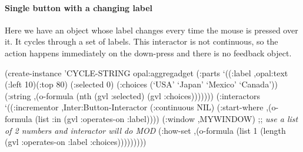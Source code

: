 \paragraph{Single button with a changing label}
Here we have an object whose label changes every time the mouse is pressed
over it.  It cycles through a set of labels.
This interactor is not continuous, so the action happens immediately on the
down-press and there is no feedback object.

\begin{programexample}
(create-instance 'CYCLE-STRING opal:aggregadget
  (:parts
   `((:label ,opal:text
             (:left 10)(:top 80)
             (:selected 0)
             (:choices (`USA' `Japan' `Mexico' `Canada'))
             (:string ,(o-formula (nth (gvl :selected) (gvl :choices)))))))
  (:interactors
   `((:incrementor ,Inter:Button-Interactor
	           (:continuous NIL)
		   (:start-where
		     ,(o-formula (list :in (gvl :operates-on :label))))
		   (:window ,MYWINDOW)
		   ;; {\it use a list of 2 numbers and interactor will do MOD}
		   (:how-set
                     ,(o-formula (list 1 (length (gvl :operates-on
                                                      :label :choices)))))))))
\end{programexample}



